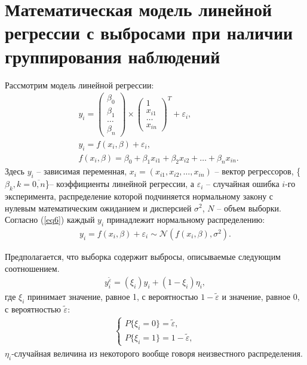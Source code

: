 \section{Математическая модель линейной регрессии с выбросами при наличии группирования наблюдений}
Рассмотрим модель линейной регрессии:
\begin{eqnarray}
    &\label{eq2}y_i= 
    \begin{pmatrix}
        \beta_0\\
        \beta_1\\
        \dots\\
        \beta_n
    \end{pmatrix}\times
    \begin{pmatrix}
        1\\
        x_{i1}\\
        \dots\\
        x_{in}
    \end{pmatrix}^{T}+ \varepsilon_i,\\
    &\label{eq6}y_i= f(x_i,\beta)+\varepsilon_i,\\
    &f(x_i,\beta)=\beta_0+\beta_1 x_{i1}+\beta_2 x_{i2}+\dots+\beta_n x_{in}.
\end{eqnarray}
Здесь $y_i$ -- зависимая переменная, $x_i=(x_{i1},x_{i2},\dots,x_{in})$ -- вектор регрессоров, \{$\beta_k, k=\overline{0,n}$\}-- коэффициенты линейной регрессии, а $\varepsilon_i$ -- случайная ошибка $i$-го эксперимента, распределение которой подчиняется нормальному закону с нулевым математическим ожиданием и дисперсией $\sigma^2$, $N$ -- объем выборки.
Согласно (\ref{eq6}) каждый $y_i$ принадлежит нормальному распределению:
\begin{eqnarray}
    \label{eq12} y_i=f(x_i,\beta)+\varepsilon_i \sim \mathcal{N}(f(x_i,\beta),\sigma^2).
\end{eqnarray}

Предполагается, что выборка содержит выбросы, описываемые следующим соотношением.
\begin{eqnarray}
    \label{eq3}y_i^{\widetilde{\varepsilon}}=(\xi_i)y_i+ (1-\xi_i)\eta_i,
\end{eqnarray}
где $\xi_i$ принимает значение, равное 1, с вероятностью $1-\widetilde{\varepsilon}$ и значение, равное 0, с вероятностью $\widetilde{\varepsilon}$:
\begin{eqnarray}\label{eq4}
    \begin{cases}
        P\{\xi_i=0\}=\widetilde{\varepsilon},\\
        P\{\xi_i=1\}=1-\widetilde{\varepsilon},
    \end{cases}
\end{eqnarray}
$\eta_i$-случайная величина из некоторого вообще говоря неизвестного распределения.

